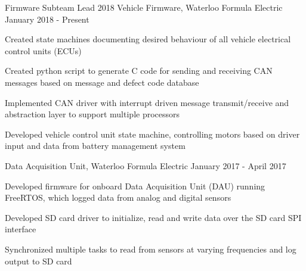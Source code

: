 

\begin{cventries}
  \cventrytwo
    {Firmware Subteam Lead} %
    {2018 Vehicle Firmware, Waterloo Formula Electric} %
    {} %
    {January 2018 - Present} %
    {
      \begin{cvitems}
        \item {Created state machines documenting desired behaviour of all vehicle electrical control units (ECUs)}
        \item {Created python script to generate C code for sending and receiving CAN messages based on message and defect code database}
        \item {Implemented CAN driver with interrupt driven message transmit/receive and abstraction layer to support multiple processors}
        \item {Developed vehicle control unit state machine, controlling motors based on driver input and data from battery management system}
      \end{cvitems}
    }

  \cventrythree
    {}
    {Data Acquisition Unit, Waterloo Formula Electric} %
    {} %
    {January 2017 - April 2017} %
    {
      \begin{cvitems} %
        \item {Developed firmware for onboard Data Acquisition Unit (DAU) running FreeRTOS, which logged data from analog and digital sensors}
        \item {Developed SD card driver to initialize, read and write data over the SD card SPI interface}
        \item {Synchronized multiple tasks to read from sensors at varying frequencies and log output to SD card}
      \end{cvitems}
    }


\end{cventries}
